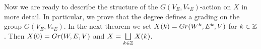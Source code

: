 \documentclass[11pt, a4paper]{article}
\begin{document}


Now we are ready to describe the structure of the 
$ G (V_E, V_{*E})$-action on $X$ in more detail. In particular, we prove that the degree defines a grading on the group $ G (V_E, V_{*E})$. In the next theorem we set $X(k)=Gr(W^{k},E^{k},V)$ for $k\in \mathbb{Z}$. Then $X(0)=Gr(W,E,V)$ and $X=\bigsqcup\limits_{k\in \mathbb{Z}} X(k)$.
\end{document}
